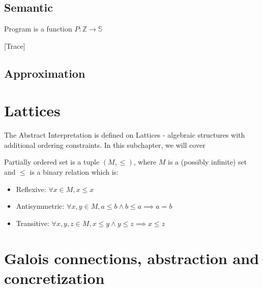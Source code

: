 \subsection{Semantic}

\begin{defn}[Program]
    Program is a function $P: \mathbb{Z} \rightarrow \mathbb{S}$
\end{defn}

\begin{defn}[Trace]
\end{defn}[Trace]

\subsection{Approximation}



\section{Lattices}

The Abstract Interpretation is defined on Lattices - algebraic structures with additional ordering constraints.
In this subchapter, we will cover

\begin{defn}
    Partially ordered set is a tuple $(M, \leq)$, where $M$ is a (possibly infinite) set and $\leq$ is a binary relation
    which is:
    \begin{itemize}
        \item Reflexive: $\forall x \in M, x \leq x$
        \item Antisymmetric: $\forall x, y \in M, a \leq b \land b \leq a \implies a = b$
        \item Transitive: $\forall x, y, z \in M, x \leq y \land y \leq z \implies x \leq z$
    \end{itemize}
\end{defn}



\section{Galois connections, abstraction and concretization} %

